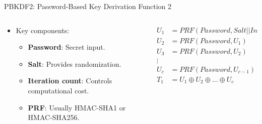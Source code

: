 \documentclass[aspectratio=169, lualatex, handout]{beamer}
\begin{document}
\begin{frame}{PBKDF2: Password-Based Key Derivation Function 2}
	\begin{columns}[c]
		\begin{column}{0.6\textwidth}
			\begin{itemize}[<+->]
				\item Key components:
				      \begin{itemize}
					      \item \textbf{Password}: Secret input.
					      \item \textbf{Salt}: Provides randomization.
					      \item \textbf{Iteration count}: Controls computational cost.
					      \item \textbf{PRF}: Usually HMAC-SHA1 or HMAC-SHA256.
				      \end{itemize}
			\end{itemize}
		\end{column}
		\begin{column}{0.4\textwidth}
			\begin{tcolorbox}[colback=black!5!white,colframe=ciphergray]
				\small
				\begin{align*}
					U_1 & = PRF(Password, Salt || Int(1))        \\
					U_2 & = PRF(Password, U_1)                   \\
					U_3 & = PRF(Password, U_2)                   \\
					\vdots                                       \\
					U_c & = PRF(Password, U_{c-1})               \\
					T_1 & = U_1 \oplus U_2 \oplus ... \oplus U_c \\
				\end{align*}
			\end{tcolorbox}
		\end{column}
	\end{columns}
\end{frame}
\end{document}

